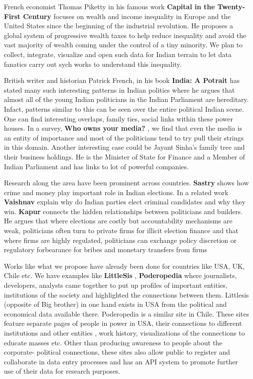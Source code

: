 French economist Thomas Piketty in his famous work \textbf{Capital in the Twenty-First Century} \cite{Piketty} focuses on wealth and income inequality in Europe and the United States since the beginning of the industrial revolution. He proposes a global system of progressive wealth taxes to help reduce inequality and avoid the vast majority of wealth coming under the control of a tiny minority. We plan to collect, integrate, visualize and open such data for Indian terrain to let data fanatics carry out sych works to understand this inequality.

British writer and historian Patrick French, in his book \textbf{India: A Potrait} \cite{French} has stated many such interesting patterns in Indian politics where he argues that almost all of the young Indian politicians in the Indian Parliament are hereditary. Infact, patterns similar to this can be seen over the entire political Indian scene. One can find interesting overlaps, family ties, social links within these power houses. In a survey, \textbf{Who owns your media?} \cite{Media}, we find that even the media is an entity of importance and most of the politicians tend to try pull their strings in this domain. Another interesting case could be Jayant Sinha's family tree \cite{Sinha} and their business holdings. He is the Minister of State for Finance and a Member of Indian Parliament and has links to lot of powerful companies.

Research along the area have been prominent across countries. \textbf{Sastry} \cite{Sastry} shows how crime and money play important role in Indian elections. In a related work \textbf{Vaishnav} \cite{Essay} explain why do Indian parties elect criminal candidates and why they win. \textbf{Kapur} \cite{Builders} connects the hidden relationships between politicians and builders. He argues that where elections are costly but accountability mechanisms are weak, politicians often turn to private firms for illicit election finance and that where firms are highly regulated, politicians can exchange policy discretion or regulatory forbearance for bribes and monetary transfers from firms

Works like what we propose have already been done for countries like USA, UK, Chile etc. We have examples like \textbf{LittleSis} \cite{LilSis}, \textbf{Poderopedia} \cite{PODERO} where journalists, developers, analysts came together to put up profiles of important entities, institutions of the society and highlighted the connections between them. Littlesis (opposite of Big brother) in one hand exists in USA from the political and economical data available there. Poderopedia is a similar site in Chile. These sites feature separate pages of people in power in USA, their connections to different institutions and other entities , work history, visualizations of the connections to educate masses etc. Other than producing awareness to people about the corporate- political connections, these sites also allow public to register and collaborate in data entry processes and has an API system to promote further use of their data for research purposes.

